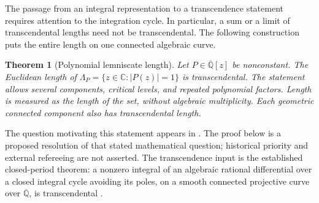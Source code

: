 \documentclass[11pt,a4paper]{article}
\newtheorem{theorem}{Theorem}[section]
\theoremstyle{definition}
\theoremstyle{remark}
\numberwithin{equation}{section}
\begin{document}
The passage from an integral representation to a transcendence statement
requires attention to the integration cycle.  In particular, a sum or a
limit of transcendental lengths need not be transcendental.  The following
construction puts the entire length on one connected algebraic curve.

\begin{theorem}[Polynomial lemniscate length]\label{beta-thm-length}
Let $P\in\overline{\mathbb Q}[z]$ be nonconstant.  The Euclidean length of
$\Lambda_P=\{z\in\mathbb C:|P(z)|=1\}$ is transcendental.  The statement
allows several components, critical levels, and repeated polynomial
factors.  Length is measured as the length of the set, without algebraic
multiplicity.  Each geometric connected component also has
transcendental length.
\end{theorem}

The question motivating this statement appears in
\cite[Remark~8.16]{beta-tamiozzo}.  The proof below is a proposed resolution
of that stated mathematical question; historical priority and external
refereeing are not asserted.  The transcendence input is the established
closed-period theorem: a nonzero integral of an algebraic rational
differential over a closed integral cycle avoiding its poles, on a smooth
connected projective curve over $\overline{\mathbb Q}$, is transcendental
\cite[Theorem~13.9 and Corollary~13.13]{dbkz-hw}.
\end{document}
